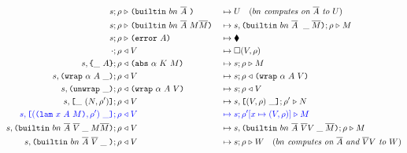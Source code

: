 \begin{figure}[!ht]
\begin{subfigure}[c]{\linewidth}
{\begin{alignat*}{2}
      s; \rho &\compute \builtin{bn}{\repetition{A}}{} &{}\mapsto{}& U \quad (\textit{$bn$ computes on $\repetition{A}$ to $U$})\\
      s; \rho &\compute \builtin{bn}{\repetition{A}}{M \repetition{M}} &{}\mapsto{}& s,\inBuiltin{bn}{\repetition{A}}{}{\_}{\repetition{M}};\rho \compute M\\
      s; \rho &\compute \error{A} &{}\mapsto{}& \ckerror{}\\
      \cdot; \rho &\return V &{}\mapsto{}& \square (V, \rho)\\
      s,\inInstLeftFrame{A}; \rho &\return \abs{\alpha}{K}{M} &{}\mapsto{}& s;\rho \compute{M} \\
      s,\inWrapRightFrame{\alpha}{A}; \rho &\return V &{}\mapsto{}& s;\rho \return \wrap{\alpha}{A}{V}\\
      s,\inUnwrapFrame{}; \rho &\return \wrap{\alpha}{A}{V} &{}\mapsto{}& s;\rho \return V\\
      s,\inAppLeftFrame{(N,\rho^{\prime})}; \rho &\return V &{}\mapsto{}& s, \inAppRightFrame{(V,\rho)};\rho^{\prime} \compute N\\
      \blue{s,\inAppRightFrame{(\lam{x}{A}{M}, \rho^{\prime})}; \rho} &\breturn V &{}\bmapsto{}& \blue{s;\rho^{\prime}[x\mapsto (V,\rho)] \compute M}\\  %
      s,  \inBuiltin{bn}{\repetition{A}}{\repetition{V}}{\_}{M \repetition{M}}{}; \rho&\return V &{}\mapsto{}& s, \inBuiltin{bn}{\repetition{A}}{\repetition{V} V}{\_}{\repetition{M}};\rho \compute M\\
      s,\inBuiltin {bn} {\repetition{A}} {\repetition{V}}{\_}{}; \rho &\return V 
                                                &{}\mapsto{}& s;\rho \compute W \quad (\textit{$bn$ computes on $\repetition{A}$ and $\repetition{V}V$ to $W$})\\
\end{alignat*}
}
\end{subfigure}
\end{figure}


